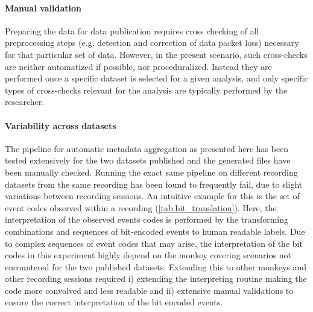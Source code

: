 \paragraph{Manual validation}
Preparing the data for data publication requires cross checking of all preprocessing steps (e.g. detection and correction of data packet loss) necessary for that particular set of data. However, in the present scenario, such cross-checks are neither automatized if possible, nor proceduralized. Instead they are performed once a specific dataset is selected for a given analysis, and only specific types of cross-checks relevant for the analysis are typically performed by the researcher.

\paragraph{Variability across datasets}
The pipeline for automatic metadata aggregation as presented here has been tested extensively for the two datasets published and the generated files have been manually checked. Running the exact same pipeline on different recording datasets from the same recording has been found to frequently fail, due to slight variations between recording sessions. An intuitive example for this is the set of event codes observed within a recording (\cref{tab:bit_translation}). Here, the interpretation of the observed events codes is performed by the  transforming combinations and sequences of bit-encoded events to human readable labels. Due to complex sequences of event codes that may arise, the interpretation of the bit codes in this experiment highly depend on the monkey covering scenarios not encountered for the two published datasets. Extending this to other monkeys and other recording sessions required i) extending the interpreting routine making the code more convolved and less readable and ii) extensive manual validations to ensure the correct interpretation of the bit encoded events.

